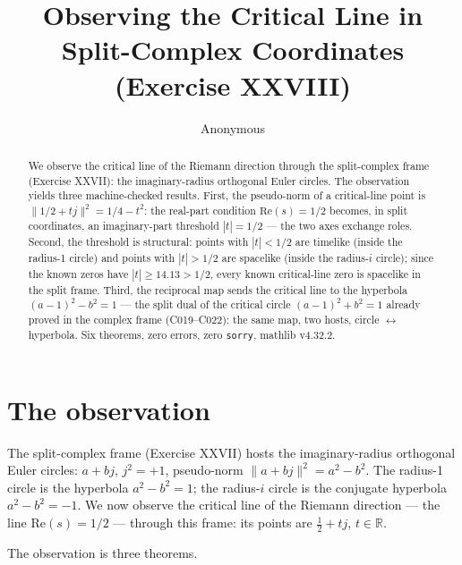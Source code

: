 \documentclass[sigplan,10pt,anonymous,review]{acmart}
\begin{document}
\title{Observing the Critical Line in Split-Complex Coordinates\\
(Exercise XXVIII)}

\author{Anonymous}

\begin{abstract}
We observe the critical line of the Riemann direction through the
split-complex frame (Exercise XXVII): the imaginary-radius orthogonal
Euler circles. The observation yields three machine-checked results.
First, the pseudo-norm of a critical-line point is
$\|1/2 + tj\|^2 = 1/4 - t^2$: the real-part condition
$\mathrm{Re}(s) = 1/2$ becomes, in split coordinates, an imaginary-part
threshold $|t| = 1/2$ --- the two axes exchange roles. Second, the
threshold is structural: points with $|t| < 1/2$ are timelike (inside
the radius-1 circle) and points with $|t| > 1/2$ are spacelike (inside
the radius-$i$ circle); since the known zeros have $|t| \ge 14.13 >
1/2$, every known critical-line zero is spacelike in the split frame.
Third, the reciprocal map sends the critical line to the hyperbola
$(a-1)^2 - b^2 = 1$ --- the split dual of the critical circle
$(a-1)^2 + b^2 = 1$ already proved in the complex frame (C019--C022):
the same map, two hosts, circle $\leftrightarrow$ hyperbola. Six
theorems, zero errors, zero \texttt{sorry}, mathlib v4.32.2.
\end{abstract}


\maketitle

\section{The observation}

The split-complex frame (Exercise XXVII) hosts the imaginary-radius
orthogonal Euler circles: $a + bj$, $j^2 = +1$, pseudo-norm
$\|a + bj\|^2 = a^2 - b^2$. The radius-1 circle is the hyperbola
$a^2 - b^2 = 1$; the radius-$i$ circle is the conjugate hyperbola
$a^2 - b^2 = -1$. We now observe the critical line of the Riemann
direction --- the line $\mathrm{Re}(s) = 1/2$ --- through this frame:
its points are $\frac12 + tj$, $t \in \mathbb{R}$.

The observation is three theorems.
\end{document}
